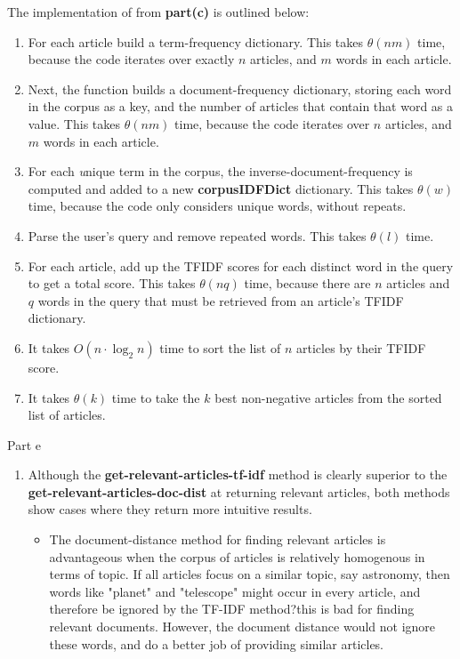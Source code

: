 \documentclass[12pt,twoside]{article}
\begin{document}
\begin{problems}
\begin{problemparts}
\vspace{5mm}

The implementation of {\bf \functionc} from {\bf part(c)} is outlined below:
\begin{enumerate}
	\item For each article build a term-frequency dictionary. This takes $\theta(nm)$ time, because the code iterates over exactly $n$ articles, and $m$ words in each article.
	\item Next, the function builds a document-frequency dictionary, storing each word in the corpus as a key, and the number of articles that contain that word as a value. This takes $\theta(nm)$ time, because the code iterates over $n$ articles, and $m$ words in each article.
	\item For each {\textit unique} term in the corpus, the inverse-document-frequency is computed and added to a new {\bf corpusIDFDict} dictionary. This takes $\theta(w)$ time, because the code only considers unique words, without repeats.
	\item Parse the user's query and remove repeated words. This takes $\theta(l)$ time.
	\item For each article, add up the TFIDF scores for each distinct word in the query to get a total score. This takes $\theta(nq)$ time, because there are $n$ articles and $q$ words in the query that must be retrieved from an article's TFIDF dictionary.
	\item It takes $O(n \cdot \log_2n)$ time to sort the list of $n$ articles by their TFIDF score.
	\item It takes $\theta(k)$ time to take the $k$ best non-negative articles from the sorted list of articles.
\end{enumerate}

\vspace{5mm}

\problempart Part e %
\begin{enumerate}
	\item Although the {\bf get-relevant-articles-tf-idf} method is clearly superior to the {\bf get-relevant-articles-doc-dist} at returning relevant articles, both methods show cases where they return more intuitive results.
	\begin{itemize}
		\item The document-distance method for finding relevant articles is advantageous when the corpus of articles is relatively homogenous in terms of topic. If all articles focus on a similar topic, say astronomy, then words like "planet" and "telescope" might occur in every article, and therefore be ignored by the TF-IDF method?this is bad for finding relevant documents. However, the document distance would not ignore these words, and do a better job of providing similar articles.
		

\end{itemize}
\end{enumerate}
\end{problemparts}
\end{problems}
\end{document}
